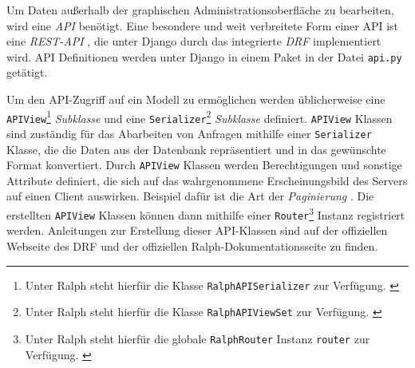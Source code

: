 Um Daten außerhalb der graphischen Administrationsoberfläche zu
bearbeiten, wird eine
\emph{API}
benötigt. Eine besondere und weit verbreitete Form einer API ist eine
\emph{REST-API}
\cite{rest-api}, die unter Django durch das integrierte
\emph{DRF}
implementiert wird.\cite{django-rest-framework} API Definitionen werden
unter Django in einem Paket in der Datei \texttt{api.py} getätigt.

Um den API-Zugriff auf ein Modell zu ermöglichen werden üblicherweise
eine \texttt{APIView}\footnote{Unter Ralph steht hierfür die Klasse
  \texttt{RalphAPISerializer} zur Verfügung. \cite{ralph-api-doku}}
\emph{Subklasse}
und eine \texttt{Serializer}\footnote{Unter Ralph steht hierfür die
  Klasse \texttt{RalphAPIViewSet} zur Verfügung. \cite{ralph-api-doku}}
\emph{Subklasse}
definiert. \texttt{APIView} Klassen sind zuständig für das Abarbeiten
von Anfragen mithilfe einer \texttt{Serializer} Klasse, die die Daten
aus der Datenbank repräsentiert und in das gewünschte Format
konvertiert. Durch \texttt{APIView} Klassen werden Berechtigungen und
sonstige Attribute definiert, die sich auf das wahrgenommene
Erscheinungsbild des Servers auf einen Client auswirken. Beispiel dafür
ist die Art der \emph{Paginierung}
\cite{django-rest-framework}.
Die erstellten \texttt{APIView} Klassen können dann mithilfe einer
\texttt{Router}\footnote{Unter Ralph steht hierfür die globale
  \texttt{RalphRouter} Instanz \texttt{router} zur Verfügung.
  \cite{ralph-api-doku}} Instanz registriert werden. Anleitungen zur
Erstellung dieser API-Klassen sind auf der offiziellen Webseite des DRF
\cite{django-rest-framework} und der offiziellen
Ralph-Dokumentationsseite \cite{ralph-api-doku} zu finden.

